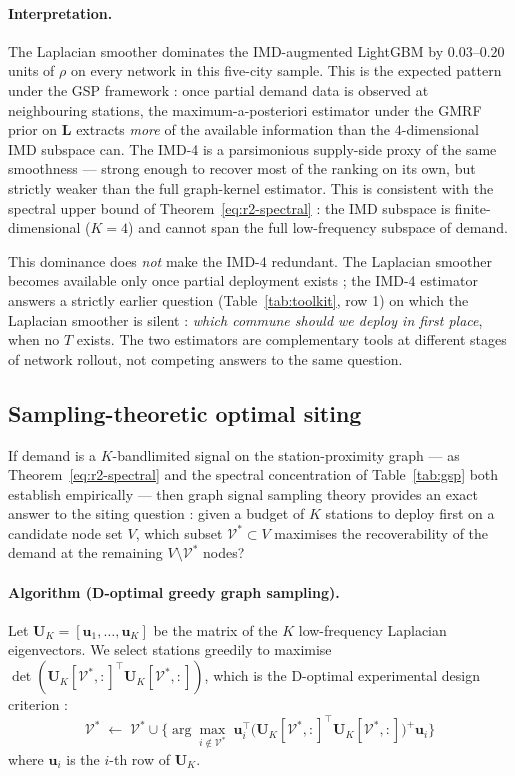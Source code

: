 \paragraph{Interpretation.}
The Laplacian smoother dominates the IMD-augmented LightGBM by
$0.03$--$0.20$ units of $\rho$ on every network in this five-city
sample.  This is the expected pattern under the GSP framework :
once partial demand data is observed at neighbouring stations,
the maximum-a-posteriori estimator under the GMRF prior on
$\mathbf{L}$ extracts \emph{more} of the available information
than the $4$-dimensional IMD subspace can.  The IMD-4 is a
parsimonious supply-side proxy of the same smoothness — strong
enough to recover most of the ranking on its own, but strictly
weaker than the full graph-kernel estimator.  This is consistent
with the spectral upper bound of Theorem~\ref{eq:r2-spectral} :
the IMD subspace is finite-dimensional ($K = 4$) and cannot
span the full low-frequency subspace of demand.

This dominance does \emph{not} make the IMD-4 redundant.  The
Laplacian smoother becomes available only once partial deployment
exists ; the IMD-4 estimator answers a strictly earlier question
(Table~\ref{tab:toolkit}, row 1) on which the Laplacian smoother
is silent : \emph{which commune should we deploy in first place},
when no $T$ exists.  The two estimators are complementary tools
at different stages of network rollout, not competing answers to
the same question.

\subsection{Sampling-theoretic optimal siting}
\label{sec:gsp-siting}

If demand is a $K$-bandlimited signal on the station-proximity
graph — as Theorem~\ref{eq:r2-spectral} and the spectral
concentration of Table~\ref{tab:gsp} both establish empirically
— then graph signal sampling theory \citep{AnisGaddeOrtega2016,Chen2015}
provides an exact answer to the siting question : given a
budget of $K$ stations to deploy first on a candidate node set
$V$, which subset $\mathcal{V}^* \subset V$ maximises the
recoverability of the demand at the remaining $V \setminus
\mathcal{V}^*$ nodes?

\paragraph{Algorithm (D-optimal greedy graph sampling).}
Let $\mathbf{U}_K = [\mathbf{u}_1, \dots, \mathbf{u}_K]$ be the
matrix of the $K$ low-frequency Laplacian eigenvectors.  We
select stations greedily to maximise
$\det(\mathbf{U}_K[\mathcal{V}^*, :]^{\top} \mathbf{U}_K[\mathcal{V}^*, :])$,
which is the D-optimal experimental design criterion :
\begin{equation}
\mathcal{V}^* \;\leftarrow\; \mathcal{V}^* \cup \Big\{ \arg\max_{i \notin \mathcal{V}^*}\;
  \mathbf{u}_i^{\top} \bigl( \mathbf{U}_K[\mathcal{V}^*, :]^{\top} \mathbf{U}_K[\mathcal{V}^*, :] \bigr)^{+} \mathbf{u}_i \Big\}
\label{eq:greedy-d-optimal}
\end{equation}
where $\mathbf{u}_i$ is the $i$-th row of $\mathbf{U}_K$.

